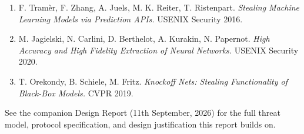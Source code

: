 \documentclass[11pt]{article}
\begin{document}
\begin{enumerate}
\item F. Tram\`er, F. Zhang, A. Juels, M. K. Reiter, T. Ristenpart.
  \emph{Stealing Machine Learning Models via Prediction APIs.} USENIX
  Security 2016.
\item M. Jagielski, N. Carlini, D. Berthelot, A. Kurakin, N. Papernot.
  \emph{High Accuracy and High Fidelity Extraction of Neural Networks.}
  USENIX Security 2020.
\item T. Orekondy, B. Schiele, M. Fritz. \emph{Knockoff Nets: Stealing
  Functionality of Black-Box Models.} CVPR 2019.
\end{enumerate}

See the companion Design Report (11th September, 2026) for the full threat
model, protocol specification, and design justification this report builds
on.
\end{document}
